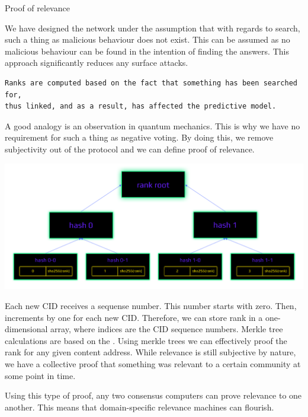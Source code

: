 \documentclass[8pt,oneside]{amsart}
\makeatletter
\newcommand{\linkgreen}[2]{\href{#1}{\color{green}{#2}}}
\renewcommand\subsection{\@startsection{subsection}
                                    {2}{\z@}
                                    {-3.25ex\@plus -1ex \@minus -.2ex}
                                    {0ex \@plus .2ex}
                                    {\play\Large}
                        }
\newcommand{\titleSection}[1]{\subsection{#1}}
\newenvironment{Figure}
  {\par\medskip\noindent\minipage{\linewidth}}
  {\endminipage\par\medskip}
\makeatother
\begin{document}
\titleSection{Proof of relevance}\label{proof-of-relevance}

We have designed the network under the assumption that with regards to search, such a thing as malicious behaviour does not exist. This can be assumed as no malicious behaviour can be found in the intention of finding the answers. This approach significantly reduces any surface attacks.

\begin{lstlisting}
Ranks are computed based on the fact that something has been searched for,
thus linked, and as a result, has affected the predictive model.
\end{lstlisting}

A good analogy is an observation in quantum mechanics. This is why we have no requirement for such a thing as negative voting. By doing this, we remove subjectivity out of the protocol and we can define proof of relevance.

\begin{Figure}
    \centering
    \includegraphics[width=1\textwidth]{rank-tree.png}
\end{Figure}

Each new CID receives a sequense number. This number starts with zero. Then, increments by one for each new CID. Therefore, we can store rank in a one-dimensional array, where indices are the CID sequence numbers. Merkle tree calculations are based on the \linkgreen{https://tools.ietf.org/html/rfc6962#section-2.1}{RFC-6962 standard}. Using merkle trees we can effectively proof the rank for any given content address. While relevance is still subjective by nature, we have a collective proof that something was relevant to a certain community at some point in time.

Using this type of proof, any two \linkgreen{https://ipfs.io/ipfs/QmdCeixQUHBjGnKfwbB1dxf4X8xnadL8xWmmEnQah5n7x2}{IBC compatible} consensus computers can prove relevance to one another. This means that domain-specific relevance machines can flourish.
\end{document}
